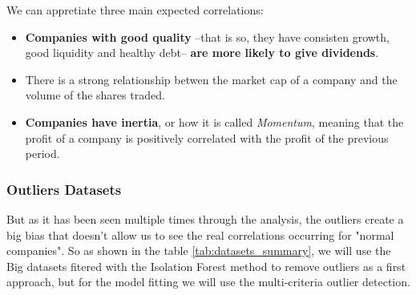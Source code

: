 \documentclass[11pt,english,a4paper,hidelinks]{book}
\begin{document}
\noindent We can appretiate three main expected correlations:
\begin{itemize}
    \item \textbf{Companies with good quality} --that is so, they have consisten growth, good liquidity and healthy debt-- \textbf{are more likely to give dividends}.
    \item There is a strong relationship betwen the market cap of a company and the volume of the shares traded.
    \item \textbf{Companies have inertia}, or how it is called \textit{Momentum}, meaning that the profit of a company is positively correlated with the profit of the previous period.
\end{itemize}

\subsubsection{Outliers Datasets}
But as it has been seen multiple times through the analysis, the outliers create a big bias that doesn't allow us to see the real correlations occurring for "normal companies". So as shown in the table \ref{tab:datasets_summary}, we will use the Big datasets fitered with the Isolation Forest method to remove outliers as a first approach, but for the model fitting we will use the multi-criteria outlier detection.
\end{document}
